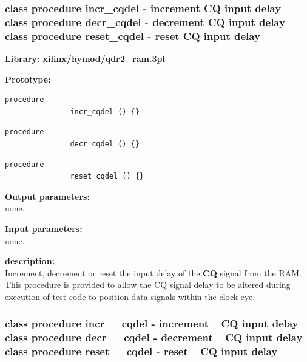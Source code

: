         \subsubsection{ class procedure incr\_cqdel - increment CQ input delay\\
                        class procedure decr\_cqdel - decrement CQ input delay\\
                        class procedure reset\_cqdel - reset CQ input delay}\label{sec:lcqdr2ramcqdel}
        

            {\bf Library: xilinx/hymod/qdr2\_ram.3pl}

            {\bf Prototype:} \\
            \vsp
            \begin{lstlisting}[gobble=12, language=threepl]
               procedure
               incr_cqdel () {}
            \end{lstlisting}
            \vsp
            \begin{lstlisting}[gobble=12, language=threepl]
               procedure
               decr_cqdel () {}
            \end{lstlisting}
            \vsp
            \begin{lstlisting}[gobble=12, language=threepl]
               procedure
               reset_cqdel () {}
            \end{lstlisting}

            {\bf Output parameters:} \\
            
            none.

            {\bf Input parameters:} \\
            
            none.

            {\bf description:} \\
            Increment, decrement or reset the input delay of the {\bf CQ}
            signal from the RAM. This procedure is provided to allow the CQ
            signal delay to be altered during execution of test code to
            position data signals within the clock eye.


        \subsubsection{ class procedure incr\_\_cqdel - increment \_CQ input delay\\
                        class procedure decr\_\_cqdel - decrement \_CQ input delay\\
                        class procedure reset\_\_cqdel - reset \_CQ input delay}\label{sec:lcqdr2ramncqdel}
        


